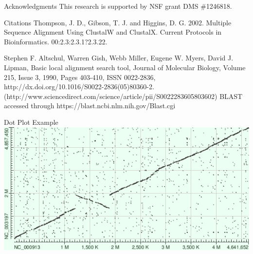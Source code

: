 \documentclass[final]{beamer}
\begin{document}
\begin{frame}{}
\begin{columns}[t]
\begin{column}{.32 \linewidth}
	  \begin{block}{Acknowledgments}
This research is supported by NSF grant DMS \#1246818.
	 \end{block}
\begin{block}{Citations}
	\footnotesize
Thompson, J. D., Gibson, T. J. and Higgins, D. G. 2002. Multiple Sequence Alignment Using ClustalW and ClustalX. Current Protocols in Bioinformatics. 00:2.3:2.3.1?2.3.22.

Stephen F. Altschul, Warren Gish, Webb Miller, Eugene W. Myers, David J. Lipman, Basic local alignment search tool, Journal of Molecular Biology, Volume 215, Issue 3, 1990, Pages 403-410, ISSN 0022-2836, http://dx.doi.org/10.1016/S0022-2836(05)80360-2.
(http://www.sciencedirect.com/science/article/pii/S0022283605803602)
BLAST accessed through https://blast.ncbi.nlm.nih.gov/Blast.cgi

\end{block}
\begin{block}{Dot Plot Example}
\includegraphics[scale = 1.25]{hit_matrixECSal.png}
\end{block}



        \end{column}

    \end{columns}

  \end{frame}
\end{document}
